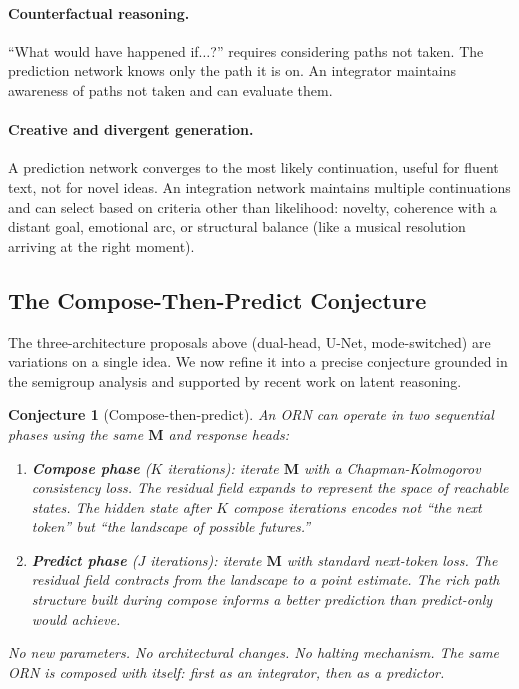 \documentclass[11pt, a4paper]{article}
\newcommand{\M}{\mathbf{M}}
\theoremstyle{plain}
\newtheorem{conjecture}{Conjecture}
\theoremstyle{definition}
\theoremstyle{remark}
\begin{document}
\paragraph{Counterfactual reasoning.}
``What would have happened if$\ldots$?'' requires considering paths not taken.
The prediction network knows only the path it is on.
An integrator maintains awareness of paths not taken and can evaluate them.

\paragraph{Creative and divergent generation.}
A prediction network converges to the most likely continuation, useful for fluent text, not for novel ideas.
An integration network maintains multiple continuations and can select based on criteria other than likelihood: novelty, coherence with a distant goal, emotional arc, or structural balance (like a musical resolution arriving at the right moment).

\subsection{The Compose-Then-Predict Conjecture}\label{sec:compose-predict}

The three-architecture proposals above (dual-head, U-Net, mode-switched) are variations on a single idea.
We now refine it into a precise conjecture grounded in the semigroup analysis and supported by recent work on latent reasoning.

\begin{conjecture}[Compose-then-predict]
An ORN can operate in two sequential phases using the \emph{same} $\M$ and response heads:
\begin{enumerate}[nosep]
    \item \textbf{Compose phase} ($K$ iterations): iterate $\M$ with a Chapman-Kolmogorov consistency loss.  The residual field \emph{expands} to represent the space of reachable states.  The hidden state after $K$ compose iterations encodes not ``the next token'' but ``the landscape of possible futures.''
    \item \textbf{Predict phase} ($J$ iterations): iterate $\M$ with standard next-token loss.  The residual field \emph{contracts} from the landscape to a point estimate.  The rich path structure built during compose informs a better prediction than predict-only would achieve.
\end{enumerate}
No new parameters.  No architectural changes.  No halting mechanism.  The same ORN is composed with itself: first as an integrator, then as a predictor.
\end{conjecture}
\end{document}
